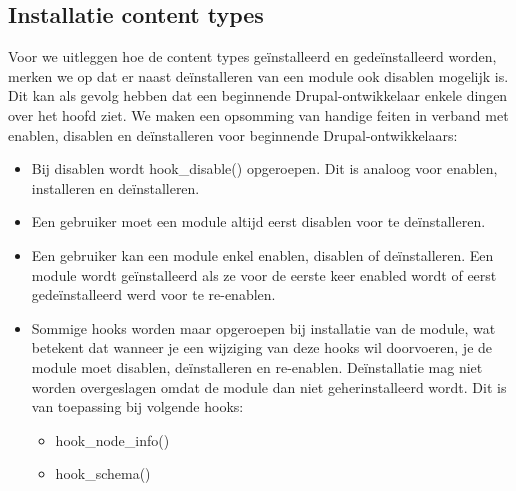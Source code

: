 

\subsection{Installatie content types}
Voor we uitleggen hoe de content types ge\"{i}nstalleerd en gede\"{i}nstalleerd worden, merken we op dat er naast de\"{i}nstalleren van een module ook disablen mogelijk is. Dit kan als gevolg hebben dat een beginnende Drupal-ontwikkelaar enkele dingen over het hoofd ziet. We maken een opsomming van handige feiten in verband met enablen, disablen en de\"{i}nstalleren voor beginnende Drupal-ontwikkelaars:
\begin{itemize}
\item Bij disablen wordt hook\_disable() opgeroepen. Dit is analoog voor enablen, installeren en de\"{i}nstalleren.
\item Een gebruiker moet een module altijd eerst disablen voor te de\"{i}nstalleren.
\item Een gebruiker kan een module enkel enablen, disablen of de\"{i}nstalleren. Een module wordt ge\"{i}nstalleerd als ze voor de eerste keer enabled wordt of eerst gede\"{i}nstalleerd werd voor te re-enablen.
\item Sommige hooks worden maar opgeroepen bij installatie van de module, wat betekent dat wanneer je een wijziging van deze hooks wil doorvoeren, je de module moet disablen, de\"{i}nstalleren en re-enablen. De\"{i}nstallatie mag niet worden overgeslagen omdat de module dan niet geherinstalleerd wordt. Dit is van toepassing bij volgende hooks:
\begin{itemize}
\item hook\_node\_info()
\item hook\_schema()
\end{itemize}
\end{itemize}

